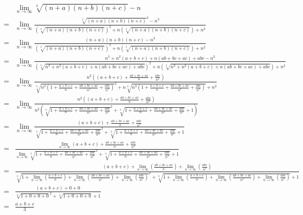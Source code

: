 \documentclass[a4paper,german,12pt,smallheadings]{scrartcl}
\begin{document}
\begin{landscape}
\begin{align*}
  &\lim_{n \to \infty} \sqrt[3]{(n+a)(n+b)(n+c)} - n \\
  = &\lim_{n \to \infty} \frac{\sqrt[3]{(n+a)(n+b)(n+c)}^3 - n^3}{\left(\sqrt[3]{(n+a)(n+b)(n+c)}\right)^2 + n\left(\sqrt[3]{(n+a)(n+b)(n+c)}\right) + n^2} \\
  = &\lim_{n \to \infty} \frac{(n+a)(n+b)(n+c) - n^3}{\left(\sqrt[3]{(n+a)(n+b)(n+c)}\right)^2 + n\left(\sqrt[3]{(n+a)(n+b)(n+c)}\right) + n^2} \\
  = &\lim_{n \to \infty} \frac{n^3 + n^2(a+b+c) + n(ab+bc+ac) + abc - n^3}{\left(\sqrt[3]{n^3 + n^2(a+b+c) + n(ab+bc+ac) + abc }\right)^2 + n\left(\sqrt[3]{n^3 + n^2(a+b+c) + n(ab+bc+ac) + abc }\right) + n^2} \\
  = &\lim_{n \to \infty} \frac{n^2\left((a+b+c) + \frac{ab+bc+ac}{n} + \frac{abc}{n^2}\right)}{\sqrt[3]{n^3 \left(1 + \frac{a+b+c}{n} + \frac{ab+bc+ac}{n^2} + \frac{abc}{n^3}\right)}^2 + n\sqrt[3]{n^3 \left(1 + \frac{a+b+c}{n} + \frac{ab+bc+ac}{n^2} + \frac{abc}{n^3}\right)} + n^2} \\
  = &\lim_{n \to \infty} \frac{n^2\left((a+b+c) + \frac{ab+bc+ac}{n} + \frac{abc}{n^2}\right)}{n^2\left(\sqrt[3]{1 + \frac{a+b+c}{n} + \frac{ab+bc+ac}{n^2} + \frac{abc}{n^3}}^2 + \sqrt[3]{1 + \frac{a+b+c}{n} + \frac{ab+bc+ac}{n^2} + \frac{abc}{n^3}} + 1\right)} \\
  = &\lim_{n \to \infty} \frac{(a+b+c) + \frac{ab+bc+ac}{n} + \frac{abc}{n^2}}{\sqrt[3]{1 + \frac{a+b+c}{n} + \frac{ab+bc+ac}{n^2} + \frac{abc}{n^3}}^2 + \sqrt[3]{1 + \frac{a+b+c}{n} + \frac{ab+bc+ac}{n^2} + \frac{abc}{n^3}} + 1} \\
  = &\frac{\lim_{n \to \infty} (a+b+c) + \frac{ab+bc+ac}{n} + \frac{abc}{n^2}}{\lim_{n \to \infty} \sqrt[3]{1 + \frac{a+b+c}{n} + \frac{ab+bc+ac}{n^2} + \frac{abc}{n^3}}^2 + \sqrt[3]{1 + \frac{a+b+c}{n} + \frac{ab+bc+ac}{n^2} + \frac{abc}{n^3}} + 1} \\
  = &\frac{(a+b+c) + \lim_{n \to \infty} \left(\frac{ab+bc+ac}{n}\right) + \lim_{n \to \infty}\left(\frac{abc}{n^2}\right)}{\sqrt[3]{1 + \lim_{n \to \infty} \left(\frac{a+b+c}{n}\right) + \lim_{n \to \infty} \left(\frac{ab+bc+ac}{n^2}\right) + \lim_{n \to \infty}\left(\frac{abc}{n^3}\right)}^2 + \sqrt[3]{1 + \lim_{n \to \infty} \left(\frac{a+b+c}{n}\right) + \lim_{n \to \infty} \left(\frac{ab+bc+ac}{n^2}\right) + \lim_{n \to \infty} \left(\frac{abc}{n^3}\right)} + 1} \\
  = &\frac{(a+b+c) + 0 + 0}{\sqrt[3]{1 + 0 + 0 + 0}^2 + \sqrt[3]{1 + 0 + 0 + 0} + 1} \\
  = &\frac{a+b+c}{3}
\end{align*}
\end{landscape}
\end{document}

